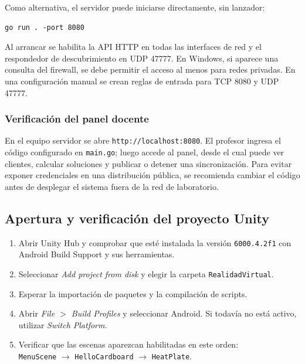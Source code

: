 Como alternativa, el servidor puede iniciarse directamente, sin lanzador:

\begin{lstlisting}[basicstyle=\ttfamily\footnotesize, frame=single, numbers=none,
caption={Inicio directo del servidor.}]
go run . -port 8080
\end{lstlisting}

Al arrancar se habilita la API HTTP en todas las interfaces de red y el respondedor de
descubrimiento en UDP 47777. En Windows, si aparece una consulta del firewall, se debe
permitir el acceso al menos para redes privadas. En una configuración manual se crean
reglas de entrada para TCP 8080 y UDP 47777.

\subsubsection{Verificación del panel docente}

En el equipo servidor se abre \texttt{http://localhost:8080}. El profesor ingresa el
código configurado en \texttt{main.go}; luego accede al panel, desde el cual puede ver
clientes, calcular soluciones y publicar o detener una sincronización. Para evitar
exponer credenciales en una distribución pública, se recomienda cambiar el código antes
de desplegar el sistema fuera de la red de laboratorio.

\subsection{Apertura y verificación del proyecto Unity}

\begin{enumerate}
    \item Abrir Unity Hub y comprobar que esté instalada la versión
    \texttt{6000.4.2f1} con Android Build Support y sus herramientas.
    \item Seleccionar \textit{Add project from disk} y elegir la carpeta
    \texttt{RealidadVirtual}.
    \item Esperar la importación de paquetes y la compilación de scripts.
    \item Abrir \textit{File $>$ Build Profiles} y seleccionar Android. Si todavía no
    está activo, utilizar \textit{Switch Platform}.
    \item Verificar que las escenas aparezcan habilitadas en este orden:\\
    {\small\texttt{MenuScene} $\rightarrow$ \texttt{HelloCardboard}
    $\rightarrow$ \texttt{HeatPlate}.}
\end{enumerate}

